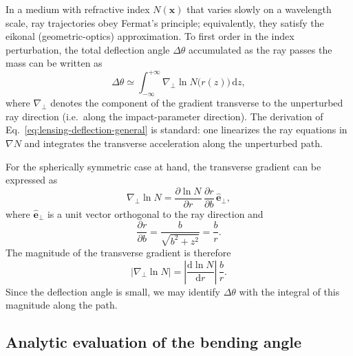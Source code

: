 \documentclass[11pt]{article}
\begin{document}
In a medium with refractive index $N(\mathbf{x})$ that varies slowly on a
wavelength scale, ray trajectories obey Fermat's principle; equivalently,
they satisfy the eikonal (geometric-optics) approximation.
To first order in the index perturbation, the total deflection angle
$\Delta\theta$ accumulated as the ray passes the mass can be written as
\begin{equation}
  \Delta\theta
  \simeq \int_{-\infty}^{+\infty} \nabla_\perp \ln N\bigl(r(z)\bigr)\,\mathrm{d}z,
  \label{eq:lensing-deflection-general}
\end{equation}
where $\nabla_\perp$ denotes the component of the gradient transverse to the
unperturbed ray direction (i.e.\ along the impact-parameter direction).
The derivation of Eq.~\eqref{eq:lensing-deflection-general} is standard:
one linearizes the ray equations in $\nabla N$ and integrates the transverse
acceleration along the unperturbed path.

For the spherically symmetric case at hand, the transverse gradient can be
expressed as
\begin{equation}
  \nabla_\perp \ln N
  = \frac{\partial \ln N}{\partial r}\,\frac{\partial r}{\partial b}\,
    \hat{\mathbf{e}}_\perp,
\end{equation}
where $\hat{\mathbf{e}}_\perp$ is a unit vector orthogonal to the ray
direction and
\begin{equation}
  \frac{\partial r}{\partial b}
  = \frac{b}{\sqrt{b^2 + z^2}}
  = \frac{b}{r}.
\end{equation}
The magnitude of the transverse gradient is therefore
\begin{equation}
  \left|\nabla_\perp \ln N\right|
  = \left|\frac{\mathrm{d}\ln N}{\mathrm{d}r}\right|\,\frac{b}{r}.
\end{equation}
Since the deflection angle is small, we may identify
$\Delta\theta$ with the integral of this magnitude along the path.


\subsection{Analytic evaluation of the bending angle}
\label{subsec:lensing-analytic}
\end{document}
